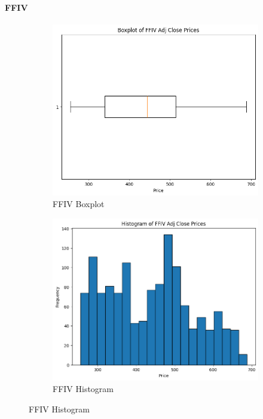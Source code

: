 \documentclass{ieeeojies}
\begin{document}
\paragraph{FFIV}
\begin{figure}[H]
    \begin{subfigure}{0.4\linewidth}
        \centering
        \includegraphics[width=\linewidth]{FFIV1.png}
        \caption{FFIV Boxplot}
        \label{fig:adbe-7-3}
    \end{subfigure}%
    \hfill
    \begin{subfigure}{0.4\linewidth}
        \centering
        \includegraphics[width=\linewidth]{FFIV2.png}
        \caption{FFIV Histogram}
        \label{fig:adbe-8-2}
    \end{subfigure}%
\end{figure}
\end{document}
